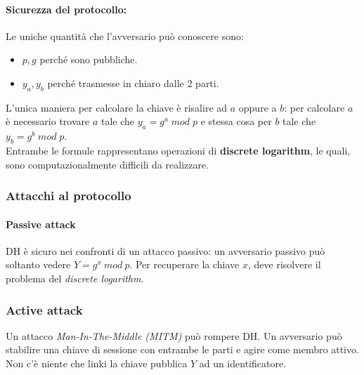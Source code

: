 \documentclass[a4paper,12pt]{article}
\begin{document}
\paragraph{Sicurezza del protocollo:} Le uniche quantità che l'avversario può conoscere sono:
\begin{itemize}
	\item $p,g$ perché sono pubbliche.
	\item $y_a,y_b$ perché trasmesse in chiaro dalle 2 parti.
\end{itemize}
L'unica maniera per calcolare la chiave è risalire ad $a$ oppure a $b$: per calcolare $a$ è necessario trovare
$a$ tale che $y_a = g^a\;mod\;p$ e stessa cosa per $b$ tale che $y_b = g^b\;mod\;p$. \\
Entrambe le formule rappresentano operazioni di \textbf{discrete logarithm}, le quali, sono computazionalmente difficili da realizzare.

\subsubsection{Attacchi al protocollo}

\paragraph{Passive attack}
DH è sicuro nei confronti di un attacco passivo: un avversario passivo può soltanto vedere $Y = g^x\ mod\ p$. Per recuperare la chiave $x$, deve risolvere il problema del \textit{discrete logarithm}.

\subsubsection{Active attack}
Un attacco \textit{Man-In-The-Middle (MITM)} può rompere DH. Un avversario può stabilire una chiave di sessione con entrambe le parti e agire come membro attivo. Non c'è niente che linki la chiave pubblica $Y$ ad un identificatore.
\end{document}
